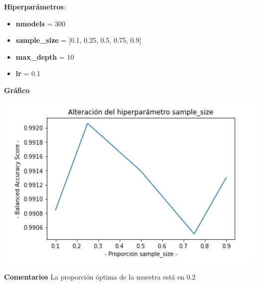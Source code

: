 \documentclass[conference,a4paper]{IEEEtran}
\begin{document}
\begin{textb}
    \textbf{Hiperparámetros}:
  \begin{itemize}
      \item \textbf{nmodels} = 300
      \item \textbf{sample\_size} = [0.1, 0.25, 0.5, 0.75, 0.9]
      \item \textbf{max\_depth} = 10
      \item \textbf{lr} = 0.1
  \end{itemize}
  \textbf{Gráfico}
  
  \begin{center}
    \includegraphics[scale=0.65]{figures/samplesize_titanic_trees.png}
    \label{fig:funcion_clasificacion}
  \end{center}
  
  \textbf{Comentarios} La proporción óptima de la muestra está en 0.2
\end{textb}
\end{document}
